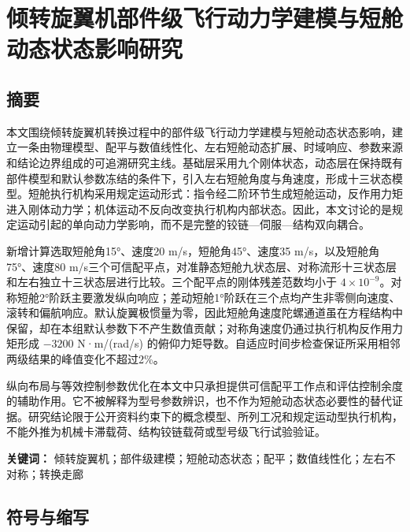\chapter{倾转旋翼机部件级飞行动力学建模与短舱动态状态影响研究}\label{ux503eux8f6cux65cbux7ffcux673aux90e8ux4ef6ux7ea7ux98deux884cux52a8ux529bux5b66ux5efaux6a21ux4e0eux77edux8231ux52a8ux6001ux72b6ux6001ux5f71ux54cdux7814ux7a76}

\section{摘要}\label{ux6458ux8981}

本文围绕倾转旋翼机转换过程中的部件级飞行动力学建模与短舱动态状态影响，建立一条由物理模型、配平与数值线性化、左右短舱动态扩展、时域响应、参数来源和结论边界组成的可追溯研究主线。基础层采用九个刚体状态，动态层在保持既有部件模型和默认参数冻结的条件下，引入左右短舱角度与角速度，形成十三状态模型。短舱执行机构采用规定运动形式：指令经二阶环节生成短舱运动，反作用力矩进入刚体动力学；机体运动不反向改变执行机构内部状态。因此，本文讨论的是规定运动引起的单向动力学影响，而不是完整的铰链---伺服---结构双向耦合。

新增计算选取短舱角15°、速度20 m/s，短舱角45°、速度35
m/s，以及短舱角75°、速度80
m/s三个可信配平点，对准静态短舱九状态层、对称流形十三状态层和左右独立十三状态层进行比较。三个配平点的刚体残差范数均小于
\(4\times10^{-9}\)。对称短舱2°阶跃主要激发纵向响应；差动短舱1°阶跃在三个点均产生非零侧向速度、滚转和偏航响应。默认旋翼极惯量为零，因此短舱角速度陀螺通道虽在方程结构中保留，却在本组默认参数下不产生数值贡献；对称角速度仍通过执行机构反作用力矩形成
\(-3200\) N·m/(rad/s)
的俯仰力矩导数。自适应时间步检查保证所采用相邻两级结果的峰值变化不超过2\%。

纵向布局与等效控制参数优化在本文中只承担提供可信配平工作点和评估控制余度的辅助作用。它不被解释为型号参数辨识，也不作为短舱动态状态必要性的替代证据。研究结论限于公开资料约束下的概念模型、所列工况和规定运动型执行机构，不能外推为机械卡滞载荷、结构铰链载荷或型号级飞行试验验证。

\textbf{关键词：}
倾转旋翼机；部件级建模；短舱动态状态；配平；数值线性化；左右不对称；转换走廊

\section{符号与缩写}\label{ux7b26ux53f7ux4e0eux7f29ux5199}


